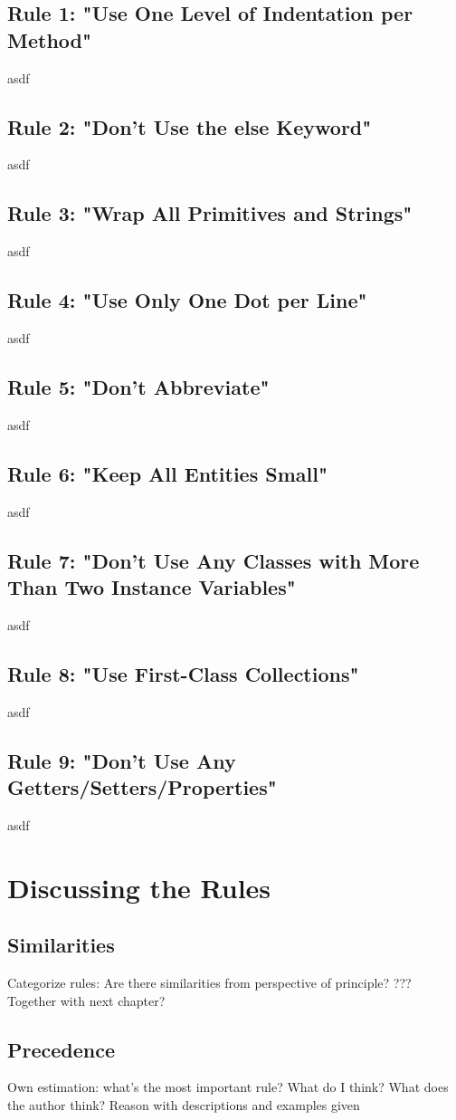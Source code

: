 \subsection{Rule 1: "Use One Level of Indentation per Method"}
asdf
\subsection{Rule 2: "Don’t Use the else Keyword"}
asdf
\subsection{Rule 3: "Wrap All Primitives and Strings"}
asdf
\subsection{Rule 4: "Use Only One Dot per Line"}
asdf
\subsection{Rule 5: "Don't Abbreviate"}
asdf
\subsection{Rule 6: "Keep All Entities Small"}
asdf
\subsection{Rule 7: "Don’t Use Any Classes with More Than Two Instance Variables"}
asdf
\subsection{Rule 8: "Use First-Class Collections"}
asdf
\subsection{Rule 9: "Don’t Use Any Getters/Setters/Properties"}
asdf
\section{Discussing the Rules}
\subsection{Similarities}
Categorize rules: Are there similarities from perspective of principle? ??? Together with next chapter?
\subsection{Precedence}
Own estimation: what's the most important rule? What do I think? What does the author think? Reason with descriptions and examples given
